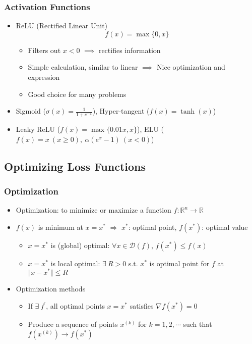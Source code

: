 \subsubsection*{Activation Functions}
\begin{itemize}
    \item ReLU (Rectified Linear Unit)
    \begin{equation}
        f(x)=\max\{0,x\}
    \end{equation}
    \begin{itemize}
        \item Filters out $x<0$ $\implies$ rectifies information
        \item Simple calculation, similar to linear $\implies$ Nice optimization and expression
        \item Good choice for many problems
    \end{itemize}
    \item Sigmoid ($\sigma(x)=\frac{1}{1+e^{-x}}$), Hyper-tangent ($f(x)=\tanh(x)$)
    \item Leaky ReLU ($f(x)=\max\{0.01x,x\}$), ELU ($f(x)=x~(x\geq 0),~\alpha(e^x-1)~(x<0)$)
\end{itemize}
\begin{figures}
\end{figures}

\subsection{Optimizing Loss Functions}

\subsubsection*{Optimization}
\begin{itemize}
    \item Optimization: to minimize or maximize a function $f:\mathbb{R}^n\to\mathbb{R}$
    \item $f(x)$ is minimum at $x=x^\ast$ $\Rightarrow$ $x^\ast$: optimal point, $f(x^\ast)$: optimal value
    \begin{itemize}
        \item $x=x^\ast$ is (global) optimal: $\forall x\in\mathcal{D}(f)$, $f(x^\ast)\leq f(x)$
        \item $x=x^\ast$ is local optimal: $\exists~R>0$ s.t. $x^\ast$ is optimal point for $f$ at $\Vert x-x^\ast\Vert\leq R$
    \end{itemize}
    \item Optimization methods
    \begin{itemize}
        \item If $\exists~f^\prime$, all optimal points $x=x^\ast$ satisfies $\nabla f(x^\ast)=0$
        \item Produce a sequence of points $x^{(k)}$ for $k=1,2,\cdots$ such that $f\left(x^{(k)}\right)\to f\left(x^\ast\right)$
    \end{itemize}
\end{itemize}

